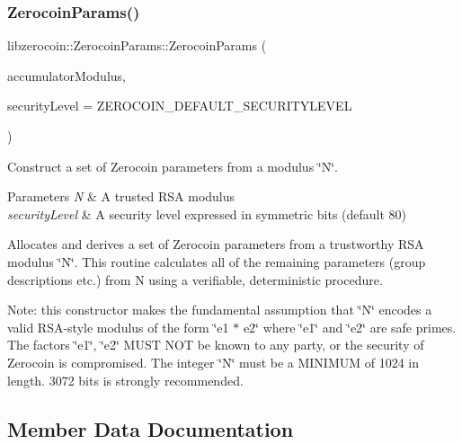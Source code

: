 \subsubsection{\texorpdfstring{Zerocoin\+Params()}{ZerocoinParams()}}
{\footnotesize\ttfamily libzerocoin\+::\+Zerocoin\+Params\+::\+Zerocoin\+Params (\begin{DoxyParamCaption}\item[{\mbox{\hyperlink{class_c_big_num}{C\+Big\+Num}}}]{accumulator\+Modulus,  }\item[{uint32\+\_\+t}]{security\+Level = {\ttfamily ZEROCOIN\+\_\+DEFAULT\+\_\+SECURITYLEVEL} }\end{DoxyParamCaption})}



Construct a set of Zerocoin parameters from a modulus \char`\"{}\+N\char`\"{}. 


\begin{DoxyParams}{Parameters}
{\em N} & A trusted R\+SA modulus \\
\hline
{\em security\+Level} & A security level expressed in symmetric bits (default 80)\\
\hline
\end{DoxyParams}
Allocates and derives a set of Zerocoin parameters from a trustworthy R\+SA modulus \char`\"{}\+N\char`\"{}. This routine calculates all of the remaining parameters (group descriptions etc.) from N using a verifiable, deterministic procedure.

Note\+: this constructor makes the fundamental assumption that \char`\"{}\+N\char`\"{} encodes a valid R\+S\+A-\/style modulus of the form \char`\"{}e1 $\ast$ e2\char`\"{} where \char`\"{}e1\char`\"{} and \char`\"{}e2\char`\"{} are safe primes. The factors \char`\"{}e1\char`\"{}, \char`\"{}e2\char`\"{} M\+U\+ST N\+OT be known to any party, or the security of Zerocoin is compromised. The integer \char`\"{}\+N\char`\"{} must be a M\+I\+N\+I\+M\+UM of 1024 in length. 3072 bits is strongly recommended. 

\subsection{Member Data Documentation}
\mbox{\label{classlibzerocoin_1_1_zerocoin_params_a4d3f02e31698e16f5edd844d3edc4b35}} 
